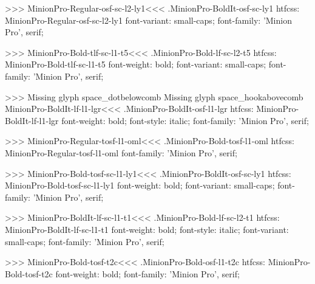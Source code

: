 {{>>>
\<MinionPro-Regular-osf-sc-l2-ly1\><<<
.MinionPro-BoldIt-osf-sc-ly1
htfcss:  MinionPro-Regular-osf-sc-l2-ly1  font-variant: small-caps; font-family: 'Minion Pro', serif;

>>>
\<MinionPro-Bold-tlf-sc-l1-t5\><<<
.MinionPro-Bold-lf-sc-l2-t5
htfcss:  MinionPro-Bold-tlf-sc-l1-t5  font-weight: bold; font-variant: small-caps; font-family: 'Minion Pro', serif;

>>>
Missing glyph	space_dotbelowcomb
Missing glyph	space_hookabovecomb
\<MinionPro-BoldIt-lf-l1-lgr\><<<
.MinionPro-BoldIt-osf-l1-lgr
htfcss:  MinionPro-BoldIt-lf-l1-lgr  font-weight: bold; font-style: italic; font-family: 'Minion Pro', serif;

>>>
\<MinionPro-Regular-tosf-l1-oml\><<<
.MinionPro-Bold-tosf-l1-oml
htfcss:  MinionPro-Regular-tosf-l1-oml  font-family: 'Minion Pro', serif;

>>>
\<MinionPro-Bold-tosf-sc-l1-ly1\><<<
.MinionPro-BoldIt-osf-sc-ly1
htfcss:  MinionPro-Bold-tosf-sc-l1-ly1  font-weight: bold; font-variant: small-caps; font-family: 'Minion Pro', serif;

>>>
\<MinionPro-BoldIt-lf-sc-l1-t1\><<<
.MinionPro-Bold-lf-sc-l2-t1
htfcss:  MinionPro-BoldIt-lf-sc-l1-t1  font-weight: bold; font-style: italic; font-variant: small-caps; font-family: 'Minion Pro', serif;

>>>
\<MinionPro-Bold-tosf-t2c\><<<
.MinionPro-Bold-osf-l1-t2c
htfcss:  MinionPro-Bold-tosf-t2c  font-weight: bold; font-family: 'Minion Pro', serif;

}}
